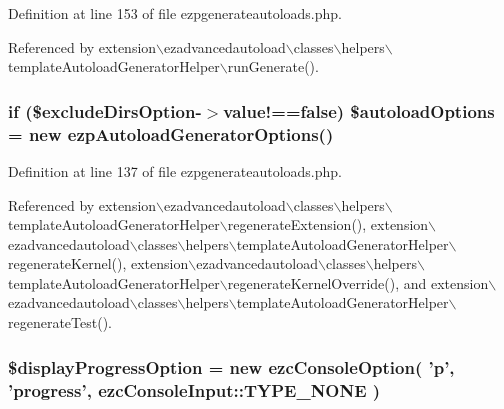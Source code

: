 Definition at line 153 of file ezpgenerateautoloads.\-php.



Referenced by extension$\backslash$ezadvancedautoload$\backslash$classes$\backslash$helpers$\backslash$template\-Autoload\-Generator\-Helper$\backslash$run\-Generate().

\hypertarget{ezpgenerateautoloads_8php_a11b2b8d92ed8fe93c2e53197e661142c}{
\subsubsection[{\$autoload\-Options}]{\setlength{\rightskip}{0pt plus 5cm}if (\$exclude\-Dirs\-Option-\/$>$value!==false) \$autoload\-Options = new ezp\-Autoload\-Generator\-Options()}}\label{ezpgenerateautoloads_8php_a11b2b8d92ed8fe93c2e53197e661142c}


Definition at line 137 of file ezpgenerateautoloads.\-php.



Referenced by extension$\backslash$ezadvancedautoload$\backslash$classes$\backslash$helpers$\backslash$template\-Autoload\-Generator\-Helper$\backslash$regenerate\-Extension(), extension$\backslash$ezadvancedautoload$\backslash$classes$\backslash$helpers$\backslash$template\-Autoload\-Generator\-Helper$\backslash$regenerate\-Kernel(), extension$\backslash$ezadvancedautoload$\backslash$classes$\backslash$helpers$\backslash$template\-Autoload\-Generator\-Helper$\backslash$regenerate\-Kernel\-Override(), and extension$\backslash$ezadvancedautoload$\backslash$classes$\backslash$helpers$\backslash$template\-Autoload\-Generator\-Helper$\backslash$regenerate\-Test().

\hypertarget{ezpgenerateautoloads_8php_a407bf0b4ef42d32212f29ac7c8e8a96e}{
\subsubsection[{\$display\-Progress\-Option}]{\setlength{\rightskip}{0pt plus 5cm}\$display\-Progress\-Option = new ezc\-Console\-Option( 'p', 'progress', ezc\-Console\-Input\-::\-T\-Y\-P\-E\-\_\-\-N\-O\-N\-E )}}\label{ezpgenerateautoloads_8php_a407bf0b4ef42d32212f29ac7c8e8a96e}


